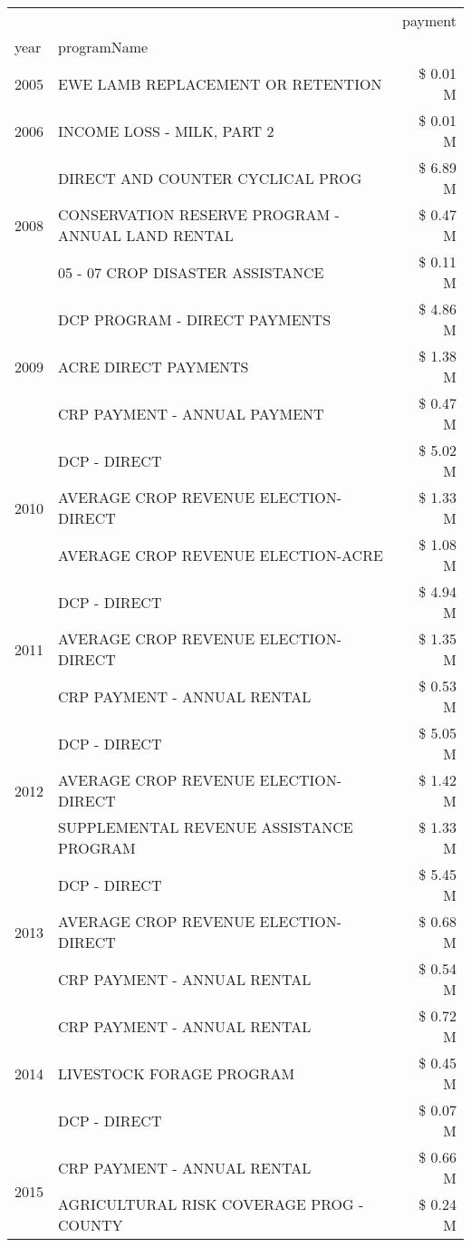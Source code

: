 \begin{tabular}{llr}
\toprule
 &  & payment \\
year & programName &  \\
\midrule
2005 & EWE LAMB REPLACEMENT OR RETENTION & \$ 0.01 M \\
\cline{1-3}
2006 & INCOME LOSS - MILK, PART 2 & \$ 0.01 M \\
\cline{1-3}
\multirow[t]{3}{*}{2008} & DIRECT AND COUNTER CYCLICAL PROG & \$ 6.89 M \\
 & CONSERVATION RESERVE PROGRAM - ANNUAL LAND RENTAL & \$ 0.47 M \\
 & 05 - 07 CROP DISASTER ASSISTANCE & \$ 0.11 M \\
\cline{1-3}
\multirow[t]{3}{*}{2009} & DCP PROGRAM - DIRECT PAYMENTS & \$ 4.86 M \\
 & ACRE DIRECT PAYMENTS & \$ 1.38 M \\
 & CRP PAYMENT - ANNUAL PAYMENT & \$ 0.47 M \\
\cline{1-3}
\multirow[t]{3}{*}{2010} & DCP - DIRECT & \$ 5.02 M \\
 & AVERAGE CROP REVENUE ELECTION-DIRECT & \$ 1.33 M \\
 & AVERAGE CROP REVENUE ELECTION-ACRE & \$ 1.08 M \\
\cline{1-3}
\multirow[t]{3}{*}{2011} & DCP - DIRECT & \$ 4.94 M \\
 & AVERAGE CROP REVENUE ELECTION-DIRECT & \$ 1.35 M \\
 & CRP PAYMENT - ANNUAL RENTAL & \$ 0.53 M \\
\cline{1-3}
\multirow[t]{3}{*}{2012} & DCP - DIRECT & \$ 5.05 M \\
 & AVERAGE CROP REVENUE ELECTION-DIRECT & \$ 1.42 M \\
 & SUPPLEMENTAL REVENUE ASSISTANCE PROGRAM & \$ 1.33 M \\
\cline{1-3}
\multirow[t]{3}{*}{2013} & DCP - DIRECT & \$ 5.45 M \\
 & AVERAGE CROP REVENUE ELECTION-DIRECT & \$ 0.68 M \\
 & CRP PAYMENT - ANNUAL RENTAL & \$ 0.54 M \\
\cline{1-3}
\multirow[t]{3}{*}{2014} & CRP PAYMENT - ANNUAL RENTAL & \$ 0.72 M \\
 & LIVESTOCK FORAGE PROGRAM & \$ 0.45 M \\
 & DCP - DIRECT & \$ 0.07 M \\
\cline{1-3}
\multirow[t]{3}{*}{2015} & CRP PAYMENT - ANNUAL RENTAL & \$ 0.66 M \\
 & AGRICULTURAL RISK COVERAGE PROG - COUNTY & \$ 0.24 M \\

\end{tabular}

